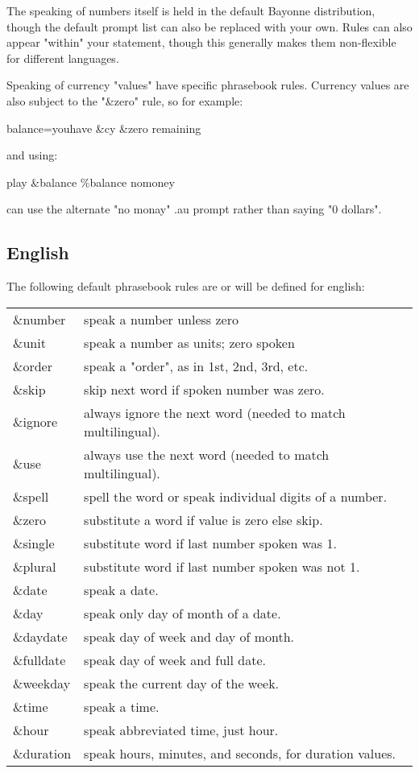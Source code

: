 \documentclass[a4paper,12pt]{article}
\begin{document}
{{{{{{{{The speaking of numbers itself is held in the default Bayonne
distribution, though the default prompt list can also be replaced with
your own.  Rules can also appear "within" your statement, though this
generally makes them non-flexible for different languages.

Speaking of currency "values" have specific phrasebook rules.  Currency
values are also subject to the "\&zero" rule, so for example:

balance=youhave \&cy \&zero remaining

and using:

play \&balance \%balance nomoney

can use the alternate "no monay" .au prompt rather than saying "0
dollars".

\subsection{English}
The following default phrasebook rules are or will be defined for english:

\begin{supertabular}{ll}
\&number        & speak a number unless zero \\
\&unit          & speak a number as units; zero spoken \\
\&order         & speak a "order", as in 1st, 2nd, 3rd, etc. \\
\&skip          & skip next word if spoken number was zero. \\
\&ignore        & always ignore the next word (needed to match multilingual). \\
\&use           & always use the next word (needed to match multilingual). \\
\&spell         & spell the word or speak individual digits of a number. \\
\&zero          & substitute a word if value is zero else skip. \\
\&single        & substitute word if last number spoken was 1. \\
\&plural        & substitute word if last number spoken was not 1. \\
\&date          & speak a date. \\
\&day           & speak only day of month of a date. \\
\&daydate	& speak day of week and day of month. \\
\&fulldate	& speak day of week and full date. \\
\&weekday       & speak the current day of the week. \\
\&time          & speak a time. \\
\&hour		& speak abbreviated time, just hour. \\
\&duration      & speak hours, minutes, and seconds, for duration values. \\
\end{supertabular}

}}}}}}}}
\end{document}
